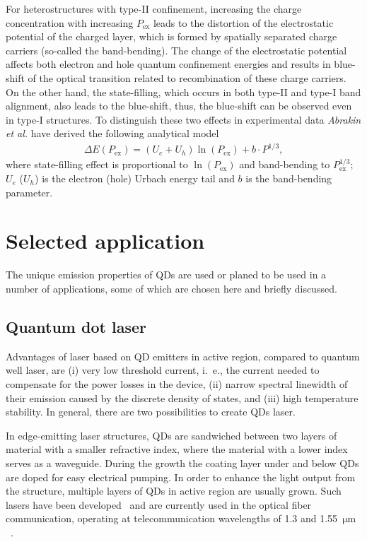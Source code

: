 \documentclass[
a4paper, %
11pt, %
onecolumn, %
openany, %
oldfontcommands,
]{memoir}
\begin{document}
For heterostructures with type-II confinement, increasing the charge concentration with increasing $P_\mathrm{ex}$ leads to the distortion of the electrostatic potential of the charged layer, which is formed by spatially separated charge carriers (so-called the band-bending). The change of the electrostatic potential affects both electron and hole quantum confinement energies and results in blue-shift of the optical transition related to recombination of these charge carriers. On the other hand, the state-filling, which occurs in both type-II and type-I band alignment, also leads to the blue-shift, thus, the blue-shift can be observed even in type-I structures. To distinguish these two effects in experimental data \textit{Abrakin et al.} have derived the following analytical model~\cite{Abramkin_blueshift_analytical}
\begin{eqnarray}
\Delta E\left(P_\mathrm{ex}\right)=\left(U_e+U_h\right)\ln\left(P_\mathrm{ex}\right) + b\cdot P^{1/3},
\end{eqnarray}
where state-filling effect is proportional to $\ln\left( P_\mathrm{ex} \right)$ and band-bending to $P_\mathrm{ex}^{1/3}$; $U_e$ ($U_h$) is the electron (hole) Urbach energy tail and $b$ is the band-bending parameter.




\section{Selected application}
The unique emission properties of QDs are used or planed to be used in a number of applications, some of which are chosen here and briefly discussed.
\subsection*{Quantum dot laser}
Advantages of laser based on QD emitters in active region, compared to quantum well laser, are (i) very low threshold current, i.~e., the current needed to compensate for the power losses in the device, (ii) narrow spectral linewidth of their emission caused by the discrete density of states, and (iii) high temperature stability. In general, there are two possibilities to create QDs laser.

In edge-emitting laser structures, QDs are sandwiched between two layers of material with a smaller refractive index, where the material with a lower index serves as a waveguide. During the growth the coating layer under and below QDs are doped for easy electrical pumping. In order to enhance the light output from the structure, multiple layers of QDs in active region are usually grown. Such lasers have been developed~\cite{Kirstaedter,SellinAPL,SellinEL,Kovsh,Ledentsov} and are currently used in the optical fiber communication, operating at telecommunication wavelengths of 1.3 and 1.55~$\mathrm{\mu m}$~\cite{QDlaser}. 
\end{document}
